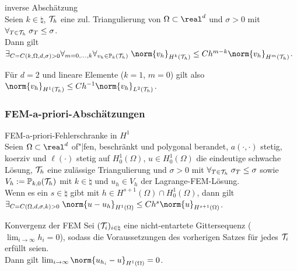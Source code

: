 \begin{Satz}{inverse Abschätzung}\\
    Seien $k \in \natural$,
    $\mathcal{T}_h$ eine zul. Triangulierung von $\Omega \subset \real^d$ und
    $\sigma > 0$ mit $\forall_{T \in \mathcal{T}_h}\; \sigma_T \le \sigma$.\\
    Dann gilt $\exists_{C = C(k, \Omega, d, \sigma) > 0}
    \forall_{m=0,\dotsc,k} \forall_{v_h \in \PP_k(\T_h)}\;
    \norm{v_h}_{H^k(\T_h)} \le Ch^{m-k} \norm{v_h}_{H^m(\T_h)}$.
\end{Satz}

\begin{Bem}
    Für $d = 2$ und lineare Elemente ($k = 1$, $m = 0$) gilt also\\
    $\norm{v_h}_{H^1(\T_h)} \le Ch^{-1} \norm{v_h}_{L^2(\T_h)}$.
\end{Bem}

\pagebreak

\subsubsection{%
    FEM-a-priori-Abschätzungen%
}

\begin{Satz}{FEM-a-priori-Fehlerschranke in $H^1$}\\
    Seien $\Omega \subset \real^d$ of"|fen, beschränkt und polygonal berandet,
    $a(\cdot, \cdot)$ stetig, koerziv und $\ell(\cdot)$ stetig auf $H^1_0(\Omega)$,
    $u \in H^1_0(\Omega)$ die eindeutige schwache Lösung,
    $\mathcal{T}_h$ eine zulässige Triangulierung und $\sigma > 0$ mit
    $\forall_{T \in \mathcal{T}_h}\; \sigma_T \le \sigma$ sowie
    $V_h := \mathbb{P}_{k,0}(\mathcal{T}_h)$ mit $k \in \natural$ und
    $u_h \in V_h$ der Lagrange-FEM-Lösung.\\
    Wenn es ein $s \in \natural$ gibt mit $h \in H^{s+1}(\Omega) \cap H^1_0(\Omega)$, dann gilt\\
    $\exists_{C = C(\Omega, d, \sigma, k) > 0}\;
    \norm{u - u_h}_{H^1(\Omega)} \le Ch^s \norm{u}_{H^{s+1}(\Omega)}$.
\end{Satz}

\begin{Satz}{Konvergenz der FEM}
    Sei $(\mathcal{T}_i)_{i \in \natural}$ eine nicht-entartete Gittersequenz
    ($\lim_{i \to \infty} h_i = 0$), sodass die Voraussetzungen des
    vorherigen Satzes für jedes $\mathcal{T}_i$ erfüllt seien.\\
    Dann gilt $\lim_{i \to \infty} \norm{u_{h_i} - u}_{H^1(\Omega)} = 0$.
\end{Satz}

